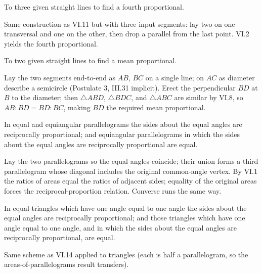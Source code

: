 \documentclass{rrxiv}
\begin{document}
\begin{claim}
\label{prop:VI.12}
To three given straight lines to find a fourth proportional.
\end{claim}
\begin{evidence}[Proof of VI.12]
\label{ev:VI.12}
Same construction as VI.11 but with three input segments: lay two on
one transversal and one on the other, then drop a parallel from the
last point.  VI.2 yields the fourth proportional.
\end{evidence}

\begin{claim}
\label{prop:VI.13}
To two given straight lines to find a mean proportional.
\end{claim}
\begin{evidence}[Proof of VI.13]
\label{ev:VI.13}
Lay the two segments end-to-end as $AB$, $BC$ on a single line; on
$AC$ as diameter describe a semicircle (Postulate 3, III.31 implicit).
Erect the perpendicular $BD$ at $B$ to the diameter; then $\triangle
ABD$, $\triangle BDC$, and $\triangle ABC$ are similar by VI.8, so
$AB : BD = BD : BC$, making $BD$ the required mean proportional.
\end{evidence}

\begin{claim}
\label{prop:VI.14}
In equal and equiangular parallelograms the sides about the equal
angles are reciprocally proportional; and equiangular parallelograms
in which the sides about the equal angles are reciprocally
proportional are equal.
\end{claim}
\begin{evidence}[Proof of VI.14]
\label{ev:VI.14}
Lay the two parallelograms so the equal angles coincide; their union
forms a third parallelogram whose diagonal includes the original
common-angle vertex.  By VI.1 the ratios of areas equal the ratios of
adjacent sides; equality of the original areas forces the
reciprocal-proportion relation.  Converse runs the same way.
\end{evidence}

\begin{claim}
\label{prop:VI.15}
In equal triangles which have one angle equal to one angle the sides
about the equal angles are reciprocally proportional; and those
triangles which have one angle equal to one angle, and in which the
sides about the equal angles are reciprocally proportional, are equal.
\end{claim}
\begin{evidence}[Proof of VI.15]
\label{ev:VI.15}
Same scheme as VI.14 applied to triangles (each is half a
parallelogram, so the areas-of-parallelograms result transfers).
\end{evidence}
\end{document}
